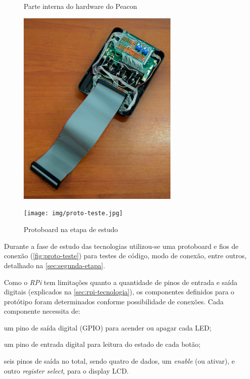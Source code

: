 \begin{figure}[htb]
	\label{teste}
	\centering
 	\begin{minipage}{0.43\textwidth}
		\centering
		\caption{\label{fig:prot-interno}Parte interna do hardware do Peacon}
		\includegraphics[width=0.7\textwidth]{img/prot-interno.jpg}
	\end{minipage}
	\hfill
	\begin{minipage}{0.55\textwidth}
		\centering
		\caption{\label{fig:proto-teste}Protoboard na etapa de estudo}
		\texttt{[image: img/proto-teste.jpg]}
	\end{minipage}
\end{figure}

Durante a fase de estudo das tecnologias utilizou-se uma protoboard e fios de conexão (\autoref{fig:proto-teste}) para testes de código, modo de conexão, entre outros, detalhado na \autoref{sec:segunda-etapa}.

Como o \textit{RPi} tem limitações quanto a quantidade de pinos de entrada e saída digitais (explicados na \autoref{sec:rpi-tecnologia}), os componentes definidos para o protótipo foram determinados conforme possibilidade de conexões. Cada componente necessita de:

\begin{alineas}
	\item um pino de saída digital (GPIO) para acender ou apagar cada LED;
	\item um pino de entrada digital para leitura do estado de cada botão;
	\item seis pinos de saída no total, sendo quatro de dados, um \textit{enable} (ou ativar), e outro \textit{register select}, para o display LCD.
\end{alineas}

